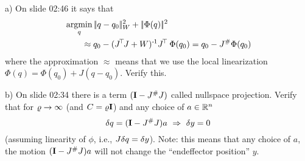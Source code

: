 

\renewcommand{\course}{Robotics}
\renewcommand{\coursepicture}{roboticsLecture}
\renewcommand{\coursedate}{Winter 2014}
\renewcommand{\exnum}{4}

\exercises









a) On slide 02:46 it says that
\begin{align*}
&\argmin_q \norm{q-q_0}_W^2 + \norm{\Phi(q)}^2 \\
 &\qquad\approx q_0 - (J^\T J + W)^\1 J^\T~ \Phi(q_0)
 =q_0 - J^\# \Phi(q_0)
\end{align*}
where the approximation $\approx$ means that we use the local
linearization $\Phi(q) = \Phi(q_0) + J (q-q_0)$. Verify this.

b) On slide 02:34 there is a term $({\rm\bf I} - J^\# J)$ called nullspace
 projection. Verify that for $\varrho\to\infty$ (and $C=\varrho{\rm\bf I}$) and any choice
 of $a\in{\mathbb{R}}^n$
$$ \delta q = ({\rm\bf I} - J^\# J) a ~ \Rightarrow ~ \delta y=0 $$
(assuming linearity of $\phi$, i.e., $J \delta q=\delta
y$). Note: this means that any choice of $a$, the motion $({\rm\bf I} - J^\# J) a$ will
not change the ``endeffector position'' $y$.

